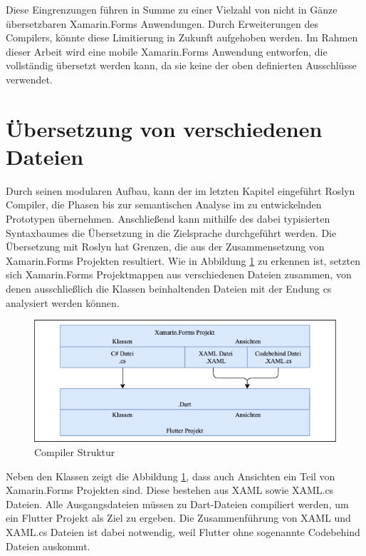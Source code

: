 Diese Eingrenzungen führen in Summe zu einer Vielzahl von nicht in Gänze übersetzbaren Xamarin.Forms Anwendungen.  Durch Erweiterungen des Compilers, könnte diese Limitierung in Zukunft aufgehoben werden.  Im Rahmen dieser Arbeit wird eine mobile Xamarin.Forms Anwendung entworfen, die vollständig übersetzt werden kann, da sie keine der oben definierten Ausschlüsse verwendet. 


\section{Übersetzung von verschiedenen Dateien}
Durch seinen modularen Aufbau,  kann der im letzten Kapitel eingeführt Roslyn Compiler,  die Phasen bis zur semantischen Analyse im zu entwickelnden Prototypen übernehmen.  Anschließend kann mithilfe des dabei typisierten Syntaxbaumes die Übersetzung in die Zielsprache durchgeführt werden.   Die Übersetzung mit Roslyn hat Grenzen,  die aus der Zusammensetzung von Xamarin.Forms Projekten resultiert.  Wie in Abbildung \ref{fig:CompilerStruktur} zu erkennen ist,  setzten sich Xamarin.Forms Projektmappen aus verschiedenen Dateien zusammen, von denen ausschließlich die Klassen beinhaltenden Dateien mit der Endung \glq cs\grq{}  analysiert werden können. 

\begin{figure}[!ht]
 \includegraphics[width=14.5cm]{Images/Compiler/CompilerArchitecture.png}
 \caption{Compiler Struktur}
 \label{fig:CompilerStruktur}
\end{figure}

Neben den Klassen zeigt die Abbildung \ref{fig:CompilerStruktur},  dass auch Ansichten ein Teil von Xamarin.Forms Projekten sind.  Diese bestehen aus \glq XAML\grq{}  sowie \glq XAML.cs\grq{}  Dateien.  Alle Ausgangsdateien müssen zu Dart-Dateien compiliert werden,  um ein Flutter Projekt als Ziel zu ergeben.  Die Zusammenführung von \glq XAML\grq{}  und \glq XAML.cs\grq{} Dateien ist dabei notwendig,  weil Flutter ohne sogenannte Codebehind Dateien auskommt. 

